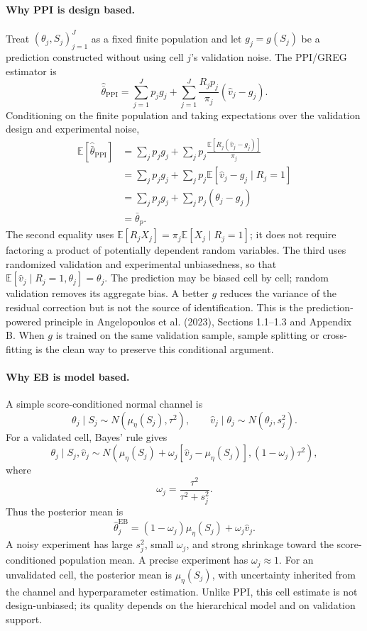 \documentclass[11pt]{article}
\newcommand{\E}{\mathbb{E}}
\begin{document}
\paragraph{Why PPI is design based.}
Treat \((\theta_j,S_j)_{j=1}^J\) as a fixed finite population and let
\(g_j=g(S_j)\) be a prediction constructed without using cell \(j\)'s
validation noise.  The PPI/GREG estimator is
\[
\widehat{\bar\theta}_{\mathrm{PPI}}
=
\sum_{j=1}^Jp_jg_j
+
\sum_{j=1}^J\frac{R_jp_j}{\pi_j}
(\widehat v_j-g_j).
\tag{PPI-finite-population}
\]
Conditioning on the finite population and taking expectations over the
validation design and experimental noise,
\begin{align*}
\E[\widehat{\bar\theta}_{\mathrm{PPI}}]
&=\sum_jp_jg_j
+\sum_jp_j\frac{\E[R_j(\widehat v_j-g_j)]}{\pi_j}\\
&=\sum_jp_jg_j
+\sum_jp_j\E[\widehat v_j-g_j\mid R_j=1]\\
&=\sum_jp_jg_j+\sum_jp_j(\theta_j-g_j)\\
&=\bar\theta_p.
\end{align*}
The second equality uses
\(\E[R_jX_j]=\pi_j\E[X_j\mid R_j=1]\); it does not require factoring a
product of potentially dependent random variables.  The third uses randomized
validation and experimental unbiasedness, so that
\(\E[\widehat v_j\mid R_j=1,\theta_j]=\theta_j\).
The prediction may be biased cell by cell; random validation removes its
aggregate bias.  A better \(g\) reduces the variance of the residual correction
but is not the source of identification.  This is the prediction-powered
principle in Angelopoulos et al. (2023), Sections 1.1--1.3 and Appendix B.
When \(g\) is trained on the same validation sample, sample splitting or
cross-fitting is the clean way to preserve this conditional argument.

\paragraph{Why EB is model based.}
A simple score-conditioned normal channel is
\[
\theta_j\mid S_j
\sim
N\!\left(\mu_\eta(S_j),\tau^2\right),
\qquad
\widehat v_j\mid\theta_j
\sim
N(\theta_j,s_j^2).
\tag{EB-channel}
\]
For a validated cell, Bayes' rule gives
\[
\theta_j\mid S_j,\widehat v_j
\sim
N\!\left(
\mu_\eta(S_j)+\omega_j[\widehat v_j-\mu_\eta(S_j)],
(1-\omega_j)\tau^2
\right),
\]
where
\[
\omega_j=\frac{\tau^2}{\tau^2+s_j^2}.
\tag{EB-shrinkage-weight}
\]
Thus the posterior mean is
\[
\widehat\theta_j^{\mathrm{EB}}
=(1-\omega_j)\mu_\eta(S_j)+\omega_j\widehat v_j.
\tag{EB-posterior-mean}
\]
A noisy experiment has large \(s_j^2\), small \(\omega_j\), and strong
shrinkage toward the score-conditioned population mean.  A precise experiment
has \(\omega_j\approx1\).  For an unvalidated cell, the posterior mean is
\(\mu_\eta(S_j)\), with uncertainty inherited from the channel and hyperparameter
estimation.  Unlike PPI, this cell estimate is not design-unbiased; its quality
depends on the hierarchical model and on validation support.
\end{document}
